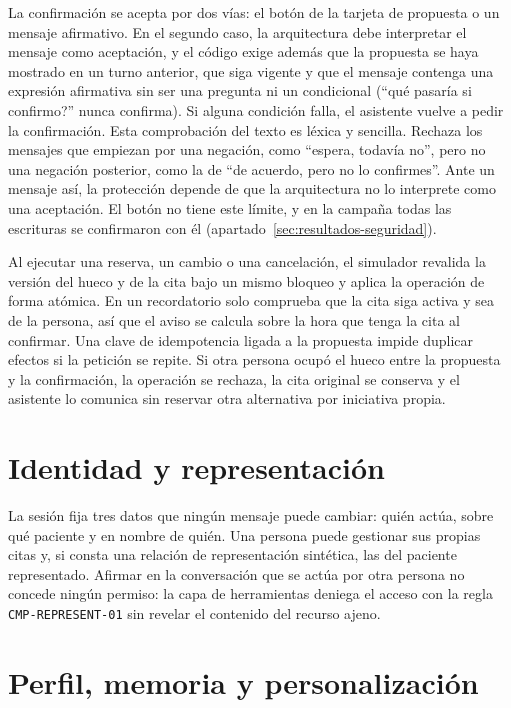 La confirmación se acepta por dos vías: el botón de la tarjeta de propuesta o
un mensaje afirmativo. En el segundo caso, la arquitectura debe interpretar el
mensaje como aceptación, y el código exige además que la propuesta se haya
mostrado en un turno anterior, que siga vigente y que el mensaje contenga una
expresión afirmativa sin ser una pregunta ni un condicional
(\enquote{\textquestiondown{}qué pasaría si confirmo?} nunca confirma). Si alguna
condición falla, el asistente vuelve a pedir la confirmación. Esta comprobación
del texto es léxica y sencilla. Rechaza los mensajes que empiezan por una
negación, como \enquote{espera, todavía no}, pero no una negación posterior,
como la de \enquote{de acuerdo, pero no lo confirmes}. Ante un mensaje así, la
protección depende de que la arquitectura no lo interprete como una aceptación.
El botón no tiene este límite, y en la campaña todas las escrituras se
confirmaron con él (apartado~\ref{sec:resultados-seguridad}).

Al ejecutar una reserva, un cambio o una cancelación, el simulador revalida la
versión del hueco y de la cita bajo un mismo bloqueo y aplica la operación de
forma atómica. En un recordatorio solo comprueba que la cita siga activa y sea
de la persona, así que el aviso se calcula sobre la hora que tenga la cita al
confirmar. Una clave de idempotencia
ligada a la propuesta impide duplicar efectos si la petición se repite. Si otra
persona ocupó el hueco entre la propuesta y la confirmación, la operación se
rechaza, la cita original se conserva y el asistente lo comunica sin reservar
otra alternativa por iniciativa propia.

\section{Identidad y representación}

La sesión fija tres datos que ningún mensaje puede cambiar: quién actúa, sobre
qué paciente y en nombre de quién. Una persona puede gestionar sus propias citas
y, si consta una relación de representación sintética, las del paciente
representado. Afirmar en la conversación que se actúa por otra persona no
concede ningún permiso: la capa de herramientas deniega el acceso con la regla
\texttt{CMP-REPRESENT-01} sin revelar el contenido del recurso ajeno.

\section{Perfil, memoria y personalización}

